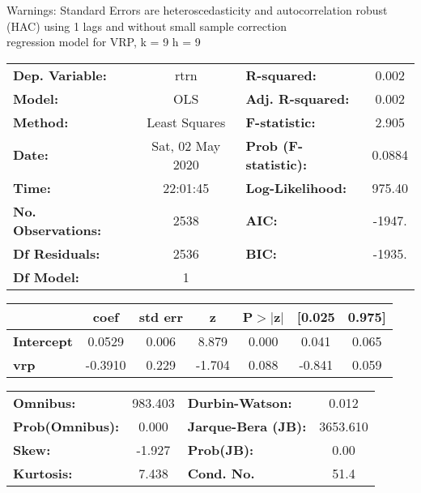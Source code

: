 Warnings: \newline
 [1] Standard Errors are heteroscedasticity and autocorrelation robust (HAC) using 1 lags and without small sample correction\\ 

regression model for VRP, k = 9 h = 9\begin{center}
\begin{tabular}{lclc}
\toprule
\textbf{Dep. Variable:}    &       rtrn       & \textbf{  R-squared:         } &     0.002   \\
\textbf{Model:}            &       OLS        & \textbf{  Adj. R-squared:    } &     0.002   \\
\textbf{Method:}           &  Least Squares   & \textbf{  F-statistic:       } &     2.905   \\
\textbf{Date:}             & Sat, 02 May 2020 & \textbf{  Prob (F-statistic):} &   0.0884    \\
\textbf{Time:}             &     22:01:45     & \textbf{  Log-Likelihood:    } &    975.40   \\
\textbf{No. Observations:} &        2538      & \textbf{  AIC:               } &    -1947.   \\
\textbf{Df Residuals:}     &        2536      & \textbf{  BIC:               } &    -1935.   \\
\textbf{Df Model:}         &           1      & \textbf{                     } &             \\
\bottomrule
\end{tabular}
\begin{tabular}{lcccccc}
                   & \textbf{coef} & \textbf{std err} & \textbf{z} & \textbf{P$> |$z$|$} & \textbf{[0.025} & \textbf{0.975]}  \\
\midrule
\textbf{Intercept} &       0.0529  &        0.006     &     8.879  &         0.000        &        0.041    &        0.065     \\
\textbf{vrp}       &      -0.3910  &        0.229     &    -1.704  &         0.088        &       -0.841    &        0.059     \\
\bottomrule
\end{tabular}
\begin{tabular}{lclc}
\textbf{Omnibus:}       & 983.403 & \textbf{  Durbin-Watson:     } &    0.012  \\
\textbf{Prob(Omnibus):} &   0.000 & \textbf{  Jarque-Bera (JB):  } & 3653.610  \\
\textbf{Skew:}          &  -1.927 & \textbf{  Prob(JB):          } &     0.00  \\
\textbf{Kurtosis:}      &   7.438 & \textbf{  Cond. No.          } &     51.4  \\
\bottomrule
\end{tabular}
\end{center}

